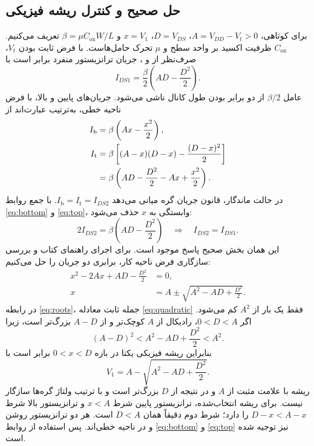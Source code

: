 \documentclass[12pt,a4paper]{article}
\begin{document}
\subsection*{حل صحیح و کنترل ریشه فیزیکی}
برای کوتاهی، \(A=V_{DD}-V_t>0\)، \(D=V_{DS}\)، \(x=V_1\) و \(\beta=\mu C_{\mathrm{ox}}W/L\) تعریف می‌کنیم. \(C_{\mathrm{ox}}\) ظرفیت اکسید بر واحد سطح و \(\mu\) تحرک حامل‌هاست. با فرض ثابت بودن \(V_t\)، صرف‌نظر از  و ، جریان ترانزیستور منفرد برابر است با
\begin{equation}
 I_{DS1}=\frac{\beta}{2}\left(AD-\frac{D^2}{2}\right).
 \label{eq:single}
\end{equation}
عامل \(\beta/2\) از دو برابر بودن طول کانال ناشی می‌شود. جریان‌های پایین و بالا، با فرض ناحیه خطی، به‌ترتیب عبارت‌اند از
\begin{align}
 I_{\mathrm{b}}&=\beta\left(Ax-\frac{x^2}{2}\right),\label{eq:bottom}\\
 I_{\mathrm{t}}&=\beta\left[(A-x)(D-x)-\frac{(D-x)^2}{2}\right]\notag\\
 &=\beta\left(AD-\frac{D^2}{2}-Ax+\frac{x^2}{2}\right).
 \label{eq:top}
\end{align}
در حالت ماندگار، قانون جریان گره میانی می‌دهد \(I_{\mathrm{b}}=I_{\mathrm{t}}=I_{DS2}\). با جمع روابط \eqref{eq:bottom} و \eqref{eq:top}، وابستگی به \(x\) حذف می‌شود:
\begin{equation}
 2I_{DS2}=\beta\left(AD-\frac{D^2}{2}\right)
 \quad\Longrightarrow\quad I_{DS2}=I_{DS1}.
 \label{eq:stack-equal}
\end{equation}
این همان بخش صحیح پاسخ موجود است. برای اجرای راهنمای کتاب و بررسی سازگاری فرض ناحیه کار، برابری دو جریان را حل می‌کنیم:
\begin{align}
 x^2-2Ax+AD-\frac{D^2}{2}&=0,\label{eq:quadratic}\\
 x&=A\pm\sqrt{A^2-AD+\frac{D^2}{2}}.\label{eq:roots}
\end{align}
در رابطه \eqref{eq:roots}، جمله ثابت معادله \eqref{eq:quadratic} فقط یک بار از \(A^2\) کم می‌شود. اگر \(0<D<A\)، رادیکال از \(A\) کوچک‌تر و از \(A-D\) بزرگ‌تر است، زیرا
\begin{equation}
 (A-D)^2<A^2-AD+\frac{D^2}{2}<A^2.
 \label{eq:root-range}
\end{equation}
بنابراین ریشه فیزیکی یکتا در بازه \(0<x<D\) برابر است با
\begin{equation}
 \boxed{V_1=A-\sqrt{A^2-AD+\frac{D^2}{2}}.}
 \label{eq:correct-v1}
\end{equation}
ریشه با علامت مثبت از \(A\) و در نتیجه از \(D\) بزرگ‌تر است و با ترتیب ولتاژ گره‌ها سازگار نیست. برای ریشه انتخاب‌شده، ترانزیستور پایین شرط \(x<A\) و ترانزیستور بالا شرط \(D-x<A-x\) را دارد؛ شرط دوم دقیقاً همان \(D<A\) است. هر دو ترانزیستور روشن و در ناحیه خطی‌اند. پس استفاده از روابط \eqref{eq:bottom} و \eqref{eq:top} نیز توجیه شده است.
\end{document}
